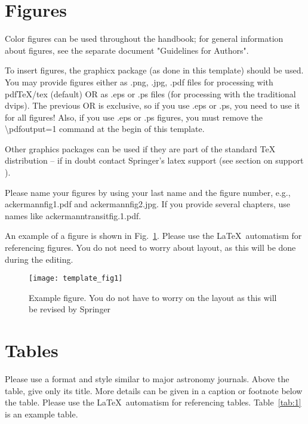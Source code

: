 \documentclass[graybox,natbib,nosecnum]{svmult}
\begin{document}
\section{Figures}
Color figures can be used throughout the handbook; for general information about figures, see the separate document "Guidelines for Authors".

To insert figures, the graphicx package (as done in this template) should be used. You may provide figures either as  .png, .jpg, .pdf files for processing with pdfTeX/tex (default) OR as .eps or .ps files (for processing with the traditional dvips). The previous OR is exclusive, so if you use .eps or .ps, you need to use it for all figures!  Also, if you use .eps or .ps figures, you must remove the \textbackslash pdfoutput=1 command at the begin of this template.

Other graphics packages can be used if they are part of the standard TeX distribution -- if in doubt contact Springer's latex support (see section on support ). 

Please name your figures by using your last name and the figure number, e.g., ackermann\textunderscore fig1.pdf and ackermann\textunderscore fig2.jpg. If you provide several chapters, use names like ackermann\textunderscore transit\textunderscore fig.1.pdf.
 
An example of a figure is shown in Fig.~\ref{fig:1}. Please use the \LaTeX\ automatism for referencing figures. You do not need to worry about layout, as this will be done during the editing. 


\begin{figure}
\texttt{[image: template\_fig1]}
%
\caption{Example figure. You do not have to worry on the layout as this will be revised by Springer}
\label{fig:1}       %
\end{figure}

\section{Tables}
Please use a format and style similar to major astronomy journals. Above the table, give only its title. More details can be given in a caption or footnote below the table. Please use the \LaTeX\ automatism for referencing tables. Table~\ref{tab:1} is an example table.
\end{document}
